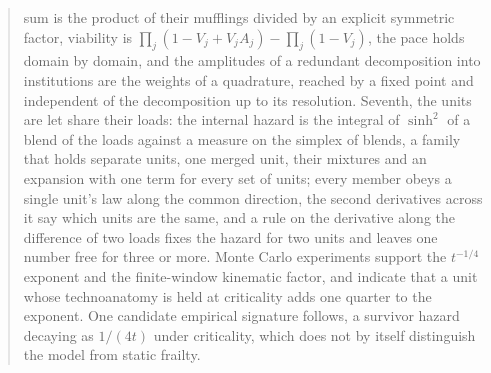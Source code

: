 \begin{abstract}
sum is the product of their mufflings divided by an explicit symmetric factor, viability is $\prod_j(1-V_j+V_jA_j)-\prod_j(1-V_j)$, the pace holds domain by domain, and the amplitudes of a redundant decomposition into institutions are the weights of a quadrature, reached by a fixed point and independent of the decomposition up to its resolution. Seventh, the units are let share their loads: the internal hazard is the integral of $\sinh^2$ of a blend of the loads against a measure on the simplex of blends, a family that holds separate units, one merged unit, their mixtures and an expansion with one term for every set of units; every member obeys a single unit's law along the common direction, the second derivatives across it say which units are the same, and a rule on the derivative along the difference of two loads fixes the hazard for two units and leaves one number free for three or more. Monte Carlo experiments support the $t^{-1/4}$ exponent and the finite-window kinematic factor, and indicate that a unit whose technoanatomy is held at criticality adds one quarter to the exponent. One candidate empirical signature follows, a survivor hazard decaying as $1/(4t)$ under criticality, which does not by itself distinguish the model from static frailty.

\end{abstract}

